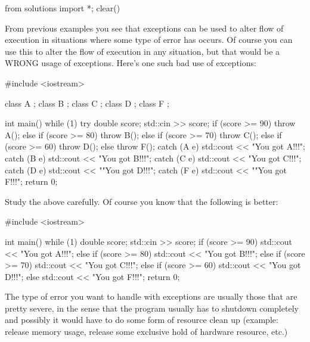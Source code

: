 \begin{python0}
from solutions import *; clear()
\end{python0}

From previous examples you see that exceptions can be used to alter flow
of execution in situations where some type of error has occurs. Of
course you can use this to alter the flow of execution in any situation,
but that would be a WRONG usage of exceptions. Here's
one such bad use of exceptions:

\begin{console}
#include <iostream>

class A {};
class B {};
class C {};
class D {};
class F {};

int main()
{   
    while (1)
    {     
          try
          {
               double score;
               std::cin >> score;
               if (score >= 90)
               {
                    throw A();
               }
               else if (score >= 80)
               {
                    throw B();
               }
               else if (score >= 70)
               {
                    throw C();
               }
               else if (score >= 60)
               {
                    throw D();
               }
               else
               {
                    throw F();
               }
          }
          catch (A e)
          {
               std::cout << "You got A!!!\n";
          }
          catch (B e)
          {
               std::cout << "You got B!!!\n";
          }
          catch (C e)
          {
               std::cout << "You got C!!!\n";
          }
          catch (D e)
          {         
               std::cout << ""You got D!!!\n";
          }
          catch (F e)
          {
               std::cout << ""You got
               F!!!\n";
          }
    }
    return 0;
}
\end{console}

Study the above carefully. Of course you know that the following is
better:

\begin{console}
#include <iostream>

int main()
{   
    while (1)
    {
        double score;
        std::cin >> score;
        if (score >= 90)
        {   
           std::cout << "You got A!!!\n";
        }
        else if (score >= 80)
        {
           std::cout << "You got B!!!\n";
        }
        else if (score >= 70)
        {
           std::cout << "You got C!!!\n";
        }
        else if (score >= 60)
        {
           std::cout << "You got D!!!\n";
        }
        else
        {
           std::cout << "You got F!!!\n";
        }
    }
    return 0;
}
\end{console}

The type of error you want to handle with exceptions are usually those
that are pretty severe, in the sense that the program usually has to
shutdown completely and possibly it would have to do some form of
resource clean up (example: release memory usage, release some exclusive
hold of hardware resource, etc.)

